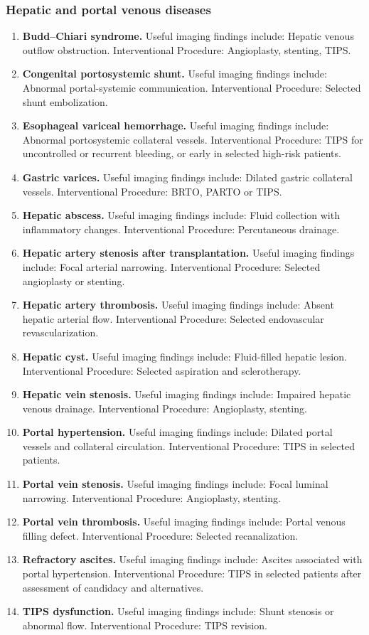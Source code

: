 \subsubsection{Hepatic and portal venous diseases}
\begin{enumerate}[leftmargin=*,itemsep=0.45em,topsep=0.4em]
\item \textbf{Budd--Chiari syndrome.} Useful imaging findings include: Hepatic venous outflow obstruction. Interventional Procedure: Angioplasty, stenting, TIPS.
\item \textbf{Congenital portosystemic shunt.} Useful imaging findings include: Abnormal portal-systemic communication. Interventional Procedure: Selected shunt embolization.
\item \textbf{Esophageal variceal hemorrhage.} Useful imaging findings include: Abnormal portosystemic collateral vessels. Interventional Procedure: TIPS for uncontrolled or recurrent bleeding, or early in selected high-risk patients.
\item \textbf{Gastric varices.} Useful imaging findings include: Dilated gastric collateral vessels. Interventional Procedure: BRTO, PARTO or TIPS.
\item \textbf{Hepatic abscess.} Useful imaging findings include: Fluid collection with inflammatory changes. Interventional Procedure: Percutaneous drainage.
\item \textbf{Hepatic artery stenosis after transplantation.} Useful imaging findings include: Focal arterial narrowing. Interventional Procedure: Selected angioplasty or stenting.
\item \textbf{Hepatic artery thrombosis.} Useful imaging findings include: Absent hepatic arterial flow. Interventional Procedure: Selected endovascular revascularization.
\item \textbf{Hepatic cyst.} Useful imaging findings include: Fluid-filled hepatic lesion. Interventional Procedure: Selected aspiration and sclerotherapy.
\item \textbf{Hepatic vein stenosis.} Useful imaging findings include: Impaired hepatic venous drainage. Interventional Procedure: Angioplasty, stenting.
\item \textbf{Portal hypertension.} Useful imaging findings include: Dilated portal vessels and collateral circulation. Interventional Procedure: TIPS in selected patients.
\item \textbf{Portal vein stenosis.} Useful imaging findings include: Focal luminal narrowing. Interventional Procedure: Angioplasty, stenting.
\item \textbf{Portal vein thrombosis.} Useful imaging findings include: Portal venous filling defect. Interventional Procedure: Selected recanalization.
\item \textbf{Refractory ascites.} Useful imaging findings include: Ascites associated with portal hypertension. Interventional Procedure: TIPS in selected patients after assessment of candidacy and alternatives.
\item \textbf{TIPS dysfunction.} Useful imaging findings include: Shunt stenosis or abnormal flow. Interventional Procedure: TIPS revision.
\end{enumerate}

